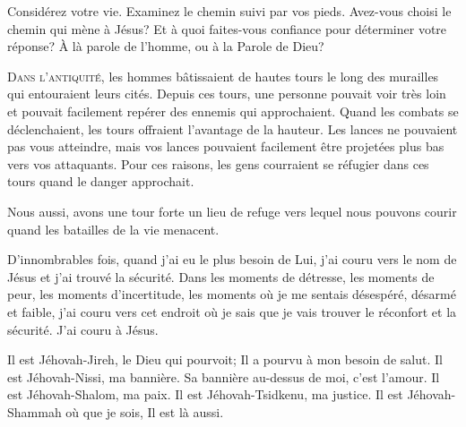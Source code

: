 Considérez votre vie. Examinez le chemin suivi par vos pieds.
 Avez-vous choisi le chemin qui mène à Jésus?
 Et à quoi faites-vous confiance pour déterminer votre réponse?
 À là parole de l'homme, ou à la Parole de Dieu?

\dvrule







\lettrine{D}{ans l'antiquité,} les hommes bâtissaient de hautes tours
 le long des murailles qui entouraient leurs cités.
 Depuis ces tours, une personne pouvait voir très loin et pouvait facilement
 repérer des ennemis qui approchaient.
 Quand les combats se déclenchaient, les tours offraient
 l'avantage de la hauteur. Les lances ne pouvaient pas vous atteindre,
 mais vos lances pouvaient facilement être projetées plus bas
 vers vos attaquants.
 Pour ces raisons, les gens courraient se réfugier dans ces tours
 quand le danger approchait. 

Nous aussi, avons une tour forte \ocadr un lieu de refuge vers lequel
 nous pouvons courir quand les batailles de la vie menacent. 


D'innombrables fois, quand j'ai eu le plus besoin de Lui,
 j'ai couru vers le nom de Jésus et j'ai trouvé la sécurité.
 Dans les moments de détresse, les moments de peur,
 les moments d'incertitude, les moments où je me sentais désespéré,
 désarmé et faible, j'ai couru vers cet endroit où je sais
 que je vais trouver le réconfort et la sécurité. J'ai couru à Jésus. 

Il est Jéhovah-Jireh, le Dieu qui pourvoit; Il 
 a pourvu à mon besoin de salut. Il est Jéhovah-Nissi, ma bannière.
 Sa bannière au-dessus de moi, c'est l'amour. Il est Jéhovah-Shalom, 
 ma paix. Il est Jéhovah-Tsidkenu, ma justice. Il est Jéhovah-Shammah 
 \ocadr où que je sois, Il est là aussi. 

